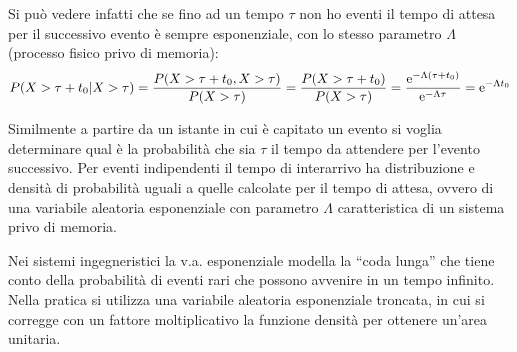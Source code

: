 Si può vedere infatti che se fino ad un tempo $\tau$ non ho eventi il tempo di attesa per il successivo evento è sempre esponenziale, con lo stesso parametro $\Lambda$ (processo fisico privo di memoria):
\[P(X>\tau+t_0|X>\tau)=\frac{P(X>\tau+t_0,X>\tau)}{P(X>\tau)}=\frac{P(X>\tau+t_0)}{P(X>\tau)}=\frac{\operatorname{e}^{-\Lambda(\tau+t_0)}}{\operatorname{e}^{-\Lambda\tau}}=\operatorname{e}^{-\Lambda t_0}\]

Similmente a partire da un istante in cui è capitato un evento si voglia determinare qual è la probabilità che sia $\tau$ il tempo da attendere per l'evento successivo. Per eventi indipendenti il tempo di interarrivo ha distribuzione e densità di probabilità uguali a quelle calcolate per il tempo di attesa, ovvero di una variabile aleatoria esponenziale con parametro $\Lambda$ caratteristica di un sistema privo di memoria.

\begin{nota}Nei sistemi ingegneristici la v.a. esponenziale modella la “coda lunga” che tiene conto della probabilità di eventi rari che possono avvenire in un tempo infinito. Nella pratica si utilizza una variabile aleatoria esponenziale troncata, in cui si corregge con un fattore moltiplicativo la funzione densità per ottenere un'area unitaria.\end{nota}

